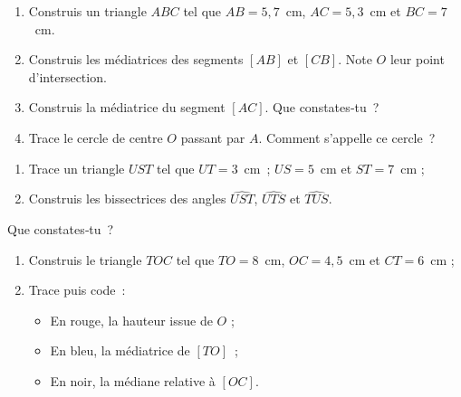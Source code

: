\begin{exercice}
\begin{enumerate}
 \item Construis un triangle $ABC$ tel que $AB = 5,7$ cm, $AC = 5,3$ cm et $BC = 7$ cm.
 \item Construis les médiatrices des segments $[AB]$ et $[CB]$. Note $O$ leur point d'intersection.
 \item Construis la médiatrice du segment $[AC]$. Que constates‑tu ?
 \item Trace le cercle de centre $O$ passant par $A$. Comment s'appelle ce cercle ?
 \end{enumerate}
\end{exercice}


\begin{exercice}
\begin{enumerate}
 \item Trace un triangle $UST$ tel que $UT = 3$ cm ; $US = 5$ cm et $ST = 7$ cm ;
 \item Construis les bissectrices des angles $\widehat{UST}$, $\widehat{UTS}$ et $\widehat{TUS}$.
 \end{enumerate}
 \vspace{-0.3cm}
Que constates‑tu ?
\end{exercice}


\begin{exercice}
\begin{enumerate}
 \item Construis le triangle $TOC$ tel que $TO = 8$ cm, $OC = 4,5$ cm et $CT = 6$ cm ;
 \item Trace puis code :
  \begin{itemize}
   \item En rouge, la hauteur issue de $O$ ;
   \item En bleu, la médiatrice de $[TO]$ ;
   \item En noir, la médiane relative à $[OC]$.
   \end{itemize} 
 \end{enumerate}
\end{exercice}


